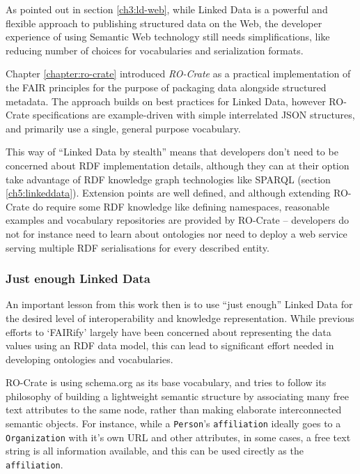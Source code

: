 As pointed out in section \vref{ch3:ld-web}, while Linked Data is a powerful and flexible approach to publishing structured data on the Web, the developer experience of using Semantic Web technology still needs simplifications, like reducing number of choices for vocabularies and serialization formats. 

Chapter \vref{chapter:ro-crate} introduced \emph{RO-Crate} as a practical implementation of the FAIR principles for the purpose of packaging data alongside structured metadata.
The approach builds on best practices for Linked Data, however RO-Crate specifications are example-driven with simple interrelated JSON structures, and primarily use a single, general purpose vocabulary. 

This way of ``Linked Data by stealth'' means that developers don't need to be concerned about RDF implementation details, although they can at their option take advantage of RDF knowledge graph technologies like SPARQL (section \vref{ch5:linkeddata}).
Extension points are well defined, and although extending RO-Crate do require some RDF knowledge like defining namespaces, reasonable examples and vocabulary repositories are provided by RO-Crate --  developers do not for instance need to learn about ontologies nor need to deploy a web service serving multiple RDF serialisations for every described entity.



\subsubsection{Just enough Linked Data}

An important lesson from this work then is to use ``just enough'' Linked Data for the desired level of interoperability and knowledge representation.
While previous efforts to `FAIRify' largely have been concerned about representing the data values using an RDF data model, this can lead to significant effort needed in developing ontologies and vocabularies. 

RO-Crate is using schema.org \cite{schema.org} as its base vocabulary, and tries to follow its philosophy of building a lightweight semantic structure by associating many free text attributes to the same node, rather than making elaborate interconnected semantic objects.
For instance, while a \texttt{Person}'s \texttt{affiliation} ideally goes to a \texttt{Organization} with it's own URL and other attributes, in some cases, a free text string is all information available, and this can be used cirectly as the \texttt{affiliation}. 

